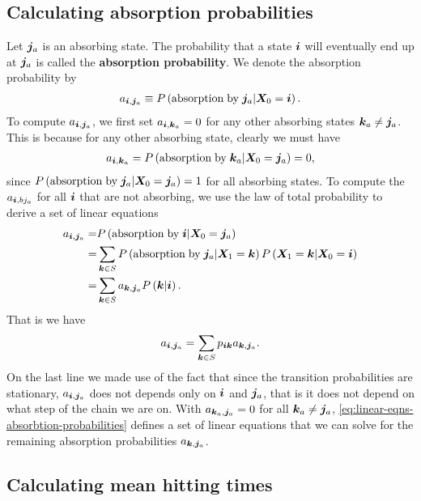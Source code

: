\subsection{Calculating absorption probabilities}
Let ${\bm j}_a$ is an absorbing state. 
The probability that a state ${\bm i}$ will eventually end up at ${\bm j}_a$ is called the \textbf{absorption probability}.
We denote the absorption probability by
\begin{align}
    a_{{\bm i},{\bm j}_a}
    \equiv
    P\left(\mathrm{absorption\;by\;}{\bm j}_a|{\bm X}_0={\bm i}\right)
    .
\end{align}
To compute $a_{{\bm i}, {\bm j}_a}$, we first set $a_{{\bm i}, {\bm k}_a}=0$ for any other absorbing states ${\bm k}_a\neq{\bm j}_a$.
This is because for any other absorbing state, clearly we must have
\begin{align}
    a_{{\bm i},{\bm k}_a}
    = 
    P\left(\mathrm{absorption\;by\;}{\bm k}_a|{\bm X}_0={\bm j}_a\right)
    =
    0
    ,
\end{align}
since $P\left(\mathrm{absorption\;by\;}{\bm j}_a|{\bm X}_0={\bm j}_a\right)=1$ for all absorbing states.
To compute the $a_{{\bm i},bj_a}$ for all ${\bm i}$ that are not absorbing, we use the law of total probability to derive a set of linear equations
\begin{align}
    \label{eq:linear-eqns-absorbtion-probabilities-derivation}
    a_{{\bm i},{\bm j}_a}
    =&
    P\left(\mathrm{absorption\;by\;}{\bm i}|{\bm X}_0={\bm j}_a\right)
    \nonumber\\
    =&
    \sum_{{\bm k}\in S} P\left(\mathrm{absorption\;by\;}{\bm j}_a|{\bm X}_1={\bm k}\right)P\left({\bm X}_1={\bm k}|{\bm X}_0={\bm i}\right)
    \nonumber\\
    =&
    \sum_{{\bm k}\in S} a_{{\bm k},{\bm j}_a} P\left({\bm k}|{\bm i}\right)  
    .
\end{align}
That is we have
\begin{align}
    \label{eq:linear-eqns-absorbtion-probabilities}
    a_{{\bm i},{\bm j}_a}
    =
    \sum_{{\bm k}\in S} p_{{\bm i}{\bm k}}a_{{\bm k},{\bm j}_a}   
    .
\end{align}
On the last line we made use of the fact that since the transition probabilities are stationary, $a_{{\bm i},{\bm j}_a}$ does not depends only on ${\bm i}$ and ${\bm j}_a$, that is it does not depend on what step of the chain we are on.
With $a_{{\bm k}_a,{\bm j}_a}=0$ for all ${\bm k}_a\neq{\bm j}_a$, \eqref{eq:linear-eqns-absorbtion-probabilities} defines a set of linear equations that we can solve for the remaining absorption probabilities $a_{{\bm k},{\bm j}_a}$.

\subsection{Calculating mean hitting times}

